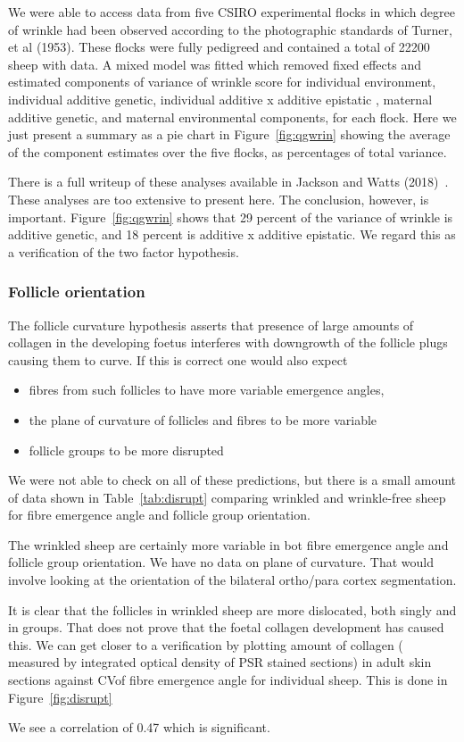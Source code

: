 \documentclass[titlepage]{article}  %
\begin{document}
We were able to access data from five CSIRO experimental flocks in which degree of wrinkle had been observed according to the photographic standards of Turner, et al (1953). These flocks were fully pedigreed and contained a total of 22200 sheep with data. A mixed model was fitted which removed fixed effects and estimated components of variance of wrinkle score  for individual environment, individual additive genetic, individual additive x additive epistatic , maternal additive genetic, and maternal environmental components, for each flock.  Here we just present a summary as a pie chart in Figure~\ref{fig:qgwrin} showing the average of the component estimates over the five flocks, as percentages of total variance. 

There is a full writeup of these analyses available in Jackson and Watts (2018)~\cite{jack:18}. These analyses are too extensive to present here. The conclusion, however, is important. Figure~\ref{fig:qgwrin} shows that 29 percent of the variance of wrinkle is additive genetic, and 18 percent is additive x additive epistatic. We regard this as a verification of the two factor hypothesis.


\subsubsection{Follicle orientation}
The follicle curvature hypothesis asserts that presence of large amounts of collagen in the developing foetus interferes with downgrowth of the follicle plugs causing them to curve. If this is correct one would also expect 
\begin{itemize}
\item fibres from such follicles to have more variable emergence angles, 
\item the plane of curvature of follicles and fibres to be more variable
\item follicle groups to be more disrupted
\end{itemize}

We were not able to check on all of these predictions, but there is a small amount of data shown in Table~\ref{tab:disrupt} comparing wrinkled and wrinkle-free sheep for fibre emergence angle and follicle group orientation.

The wrinkled sheep are certainly more variable in bot fibre emergence angle and follicle group orientation. We have no data on plane of curvature. That would involve looking at the orientation of the bilateral ortho/para cortex segmentation.

It is clear that the follicles in wrinkled sheep are more dislocated, both singly and in groups. That does not prove that the foetal collagen development  has caused this.  We can get closer to a verification by plotting amount of collagen ( measured by integrated optical density of PSR stained sections) in adult skin sections against CVof fibre emergence angle for individual sheep. This is done in Figure~\ref{fig:disrupt}

We see a correlation of 0.47 which is significant.
\end{document}

